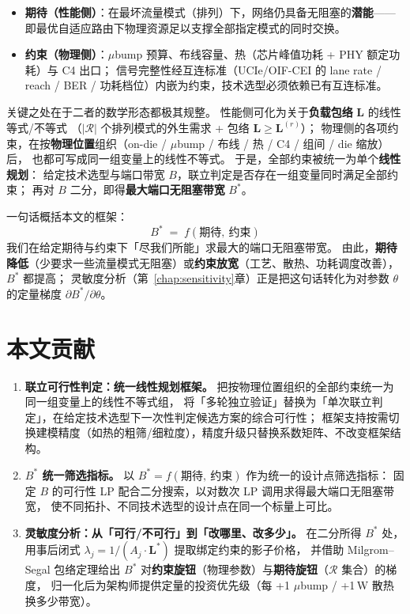\begin{itemize}
\item \textbf{期待（性能侧）}：在最坏流量模式（排列）下，网络仍具备无阻塞的\textbf{潜能}——
即最优自适应路由下物理资源足以支撑全部指定模式的同时交换。
\item \textbf{约束（物理侧）}：$\mu$bump 预算、布线容量、热（芯片峰值功耗 + PHY 额定功耗）与 C4 出口；
信号完整性经互连标准（UCIe/OIF-CEI 的 lane rate / reach / BER / 功耗档位）内嵌为约束，技术选型必须依赖已有互连标准。
\end{itemize}

关键之处在于二者的数学形态都极其规整。
性能侧可化为关于\textbf{负载包络} $\mathbf{L}$ 的线性等式/不等式
（$|\mathcal{R}|$ 个排列模式的外生需求 + 包络 $\mathbf{L}\ge\mathbf{L}^{(r)}$）；
物理侧的各项约束，在按\textbf{物理位置}组织（on-die / $\mu$bump / 布线 / 热 / C4 / 组间 / die 缩放）后，
也都可写成同一组变量上的线性不等式。
于是，全部约束被统一为单个\textbf{线性规划}：
给定技术选型与端口带宽 $B$，联立判定是否存在一组变量同时满足全部约束；
再对 $B$ 二分，即得\textbf{最大端口无阻塞带宽} $B^*$。

一句话概括本文的框架：
\begin{equation}\label{eq:intro-bstar}
    B^* \;=\; f(\text{期待},\ \text{约束})
\end{equation}
我们在给定期待与约束下「尽我们所能」求最大的端口无阻塞带宽。
由此，\textbf{期待降低}（少要求一些流量模式无阻塞）或\textbf{约束放宽}（工艺、散热、功耗调度改善），$B^*$ 都提高；
灵敏度分析（第~\ref{chap:sensitivity}章）正是把这句话转化为对参数 $\theta$ 的定量梯度 $\partial B^*/\partial\theta$。

\section{本文贡献}\label{sec:intro-contrib}

\begin{enumerate}
\item \textbf{联立可行性判定：统一线性规划框架。}
把按物理位置组织的全部约束统一为同一组变量上的线性不等式组，
将「多轮独立验证」替换为「单次联立判定」，在给定技术选型下一次性判定候选方案的综合可行性；
框架支持按需切换建模精度（如热的粗筛/细粒度），精度升级只替换系数矩阵、不改变框架结构。

\item \textbf{$B^*$ 统一筛选指标。}
以 $B^* = f(\text{期待},\ \text{约束})$ 作为统一的设计点筛选指标：
固定 $B$ 的可行性 LP 配合二分搜索，以对数次 LP 调用求得最大端口无阻塞带宽，
使不同拓扑、不同技术选型的设计点在同一个标量上可比。

\item \textbf{灵敏度分析：从「可行/不可行」到「改哪里、改多少」。}
在二分所得 $B^*$ 处，用事后闭式 $\lambda_j = 1/(A_j\cdot\mathbf{L}^*)$ 提取绑定约束的影子价格，
并借助 Milgrom--Segal 包络定理给出 $B^*$ 对\textbf{约束旋钮}（物理参数）与\textbf{期待旋钮}（$\mathcal{R}$ 集合）的梯度，
归一化后为架构师提供定量的投资优先级（每 +1 $\mu$bump / +1\,W 散热换多少带宽）。
\end{enumerate}
